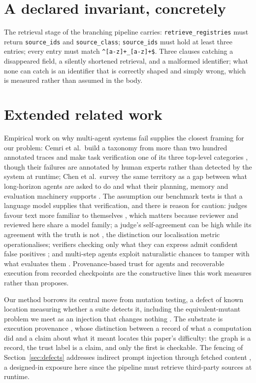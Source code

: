 \section{A declared invariant, concretely}
\label{app:invariant}

The retrieval stage of the branching pipeline carries: \texttt{retrieve\_registries} must
return \texttt{source\_ids} and \texttt{source\_class}; \texttt{source\_ids} must hold at
least three entries; every entry must match \texttt{\^{}[a-z]+\_[a-z]+\$}. Three clauses
catching a disappeared field, a silently shortened retrieval, and a malformed identifier;
what none can catch is an identifier that is correctly shaped and simply wrong, which is
measured rather than assumed in the body.

\section{Extended related work}
\label{app:related}

Empirical work on why multi-agent systems fail supplies the closest framing for our
problem: Cemri et al.\ build a taxonomy from more than two hundred annotated traces and
make task verification one of its three top-level categories \cite{cemri2025multiagent},
though their failures are annotated by human experts rather than detected by the system at
runtime; Chen et al.\ survey the same territory as a gap between what long-horizon agents
are asked to do and what their planning, memory and evaluation machinery supports
\cite{chen2026horizon}. The assumption our benchmark tests is that a language model
supplies that verification, and there is reason for caution: judges favour text more
familiar to themselves \cite{wataoka2024selfpreference}, which matters because reviewer
and reviewed here share a model family; a judge's self-agreement can be high while its
agreement with the truth is not \cite{norman2026reliability}, the distinction our
localisation metric operationalises; verifiers checking only what they can express admit
confident false positives \cite{helff2026gaming}; and multi-step agents exploit
naturalistic chances to tamper with what evaluates them \cite{thaman2026rewardhacking}.
Provenance-based trust for agents \cite{wang2026traces} and recoverable execution from
recorded checkpoints \cite{zhuang2026agentrewind} are the constructive lines this work
measures rather than proposes.

Our method borrows its central move from mutation testing, a defect of known location
measuring whether a suite detects it, including the equivalent-mutant problem we meet as
an injection that changes nothing \cite{jia2011mutation}. The substrate is execution
provenance \cite{freire2008provenance}, whose distinction between a record of what a
computation did and a claim about what it meant locates this paper's difficulty: the graph
is a record, the trust label is a claim, and only the first is checkable. The fencing of
Section~\ref{sec:defects} addresses indirect prompt injection through fetched content
\cite{greshake2023injection}, a designed-in exposure here since the pipeline must retrieve
third-party sources at runtime.

